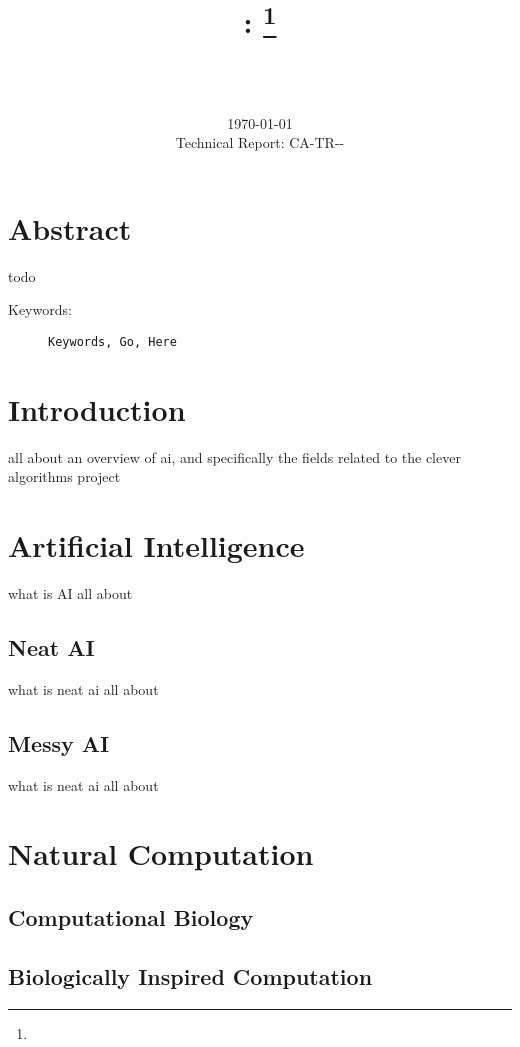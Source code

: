 \documentclass[a4paper, 11pt]{article}
\title{{\myreporttitle}: {\myreportsubtitle}\footnote{\myreportlicense}}
\author{\myreportauthor\\{\myreportemail}\\\small\myreportproject}
\date{\today\\{\small{Technical Report: CA-TR-{\myreportdate}-\myreportversion}}}
\begin{document}
\maketitle

\section*{Abstract} 
todo

\begin{description}
	\item[Keywords:] {\small\texttt{Keywords, Go, Here}}
\end{description} 

\section{Introduction}
\label{sec:introduction}

all about an overview of ai, and specifically the fields related to the clever algorithms project

% 
% 
\section{Artificial Intelligence}
\label{sec:artificial_intelligence}
what is AI all about

\subsection{Neat AI}
what is neat ai all about

\subsection{Messy AI}
what is neat ai all about


% 
% 
\section{Natural Computation}

\subsection{Computational Biology}

\subsection{Biologically Inspired Computation}
\end{document}
